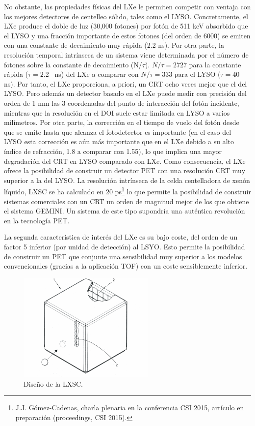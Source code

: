 No obstante, las propiedades físicas del LXe le permiten competir con ventaja con los mejores detectores de centelleo sólido, tales como el LYSO. Concretamente, el LXe produce el doble de luz (30,000 fotones) por fotón de 511 keV absorbido que el LYSO y una fracción importante de estos fotones (del orden de 6000) se emiten con una constante de decaimiento muy rápida (2.2 ns). Por otra parte, la resolución temporal intrínseca de un sistema viene determinada por el número de fotones sobre la constante de decaimiento (N/$\tau$). $N/\tau =2727$ para la constante rápida ($\tau = 2.2$~ ns) del LXe a comparar con $N/\tau =333$ para el LYSO ($\tau = 40$~ ns). Por tanto, el LXe proporciona, a priori, un CRT ocho veces mejor que el del LYSO. Pero además un detector basado en el LXe puede medir con precisión del orden de 1 mm las 3 coordenadas del punto de interacción del fotón incidente, mientras que la resolución en el DOI suele estar limitada en LYSO a varios milímetros. Por otra parte, la corrección en el tiempo de vuelo del fotón desde que se emite hasta que alcanza el fotodetector es importante (en el caso del LYSO esta corrección es aún más importante que en el LXe debido a su alto índice de refracción, 1.8 a comparar con 1.55), lo que implica una mayor degradación del CRT en LYSO comparado con LXe. Como consecuencia, el LXe ofrece la posibilidad de construir un detector PET con una resolución CRT muy superior a la del LYSO. La resolución intrínseca de la celda centelladora de xenón líquido, LXSC  se ha calculado en 20 ps\footnote{J.J. Gómez-Cadenas, charla plenaria en la conferencia CSI 2015, artículo en preparación (proceedings, CSI 2015). }  lo que permite la posibilidad de construir sistemas comerciales con un CRT un orden de magnitud mejor de los que obtiene el sistema GEMINI. Un sistema de este tipo supondría una auténtica revolución en la tecnología PET.

La segunda característica de interés del LXe es su bajo coste, del orden de un factor 5 inferior (por unidad de detección) al LSYO. Esto permite la posibilidad de construir un PET que conjunte una sensibilidad muy superior a los modelos convencionales (gracias a la aplicación TOF) con un coste sensiblemente inferior. 

\begin{figure}
\centering
\includegraphics[width=0.6\textwidth]{img/LXSC2.pdf}
\caption{\small Diseño de la LXSC.} \label{fig.BOX}
\end{figure} 


